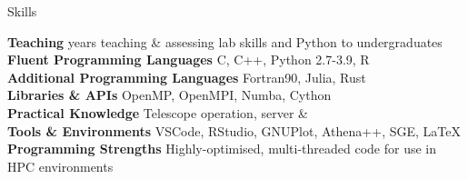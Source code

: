 \documentclass{resume} %
\begin{document}
\begin{rSection}{Skills}


{\bf Teaching}  years teaching \& assessing lab skills and Python to undergraduates \\
{\bf Fluent Programming Languages} \dotfill C, C++, Python 2.7-3.9, R \\
{\bf Additional Programming Languages} \dotfill Fortran90, Julia, Rust \\
{\bf Libraries \& APIs} \dotfill OpenMP, OpenMPI, Numba, Cython \\
{\bf Practical Knowledge} \dotfill Telescope operation, server \& \\
{\bf Tools \& Environments} \dotfill VSCode, RStudio, GNUPlot, Athena++, SGE, \LaTeX \\
{\bf Programming Strengths} \dotfill Highly-optimised, multi-threaded code for use in HPC environments

\end{rSection}





\end{document}
